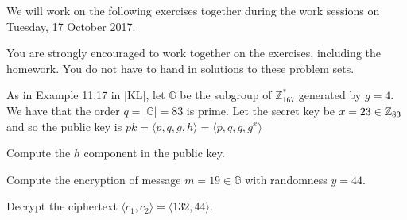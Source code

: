 \documentclass[a4paper,10pt,landscape,twocolumn]{scrartcl}
\newcommand\worksession{Tuesday, 17 October 2017}
\begin{document}
\problems

{\sffamily\noindent
We will work on the following exercises together during the work sessions on \worksession.

You are strongly encouraged to work together on the exercises, including the homework. You do not have to hand in solutions to these problem sets.}


\begin{exercise}
As in Example 11.17 in [KL], let $\mathbb{G}$ be the subgroup of $\mathbb{Z}_{167}^*$ generated by $g=4$. We have that the order $q=|\mathbb{G}|=83$ is prime. Let the secret key be $x=23 \in \mathbb{Z}_{83}$ and so the public key is $pk = \langle p,q,g,h \rangle = \langle p,q,g,g^x \rangle$ 
\begin{subex}
Compute the $h$ component in the public key.
\end{subex}
\begin{subex}
Compute the encryption of message $m=19 \in \mathbb{G}$ with randomness $y=44$.
\end{subex}
\begin{subex}
Decrypt the ciphertext $\langle c_1,c_2 \rangle = \langle 132,44 \rangle$.
\end{subex}
\end{exercise}
\end{document}
